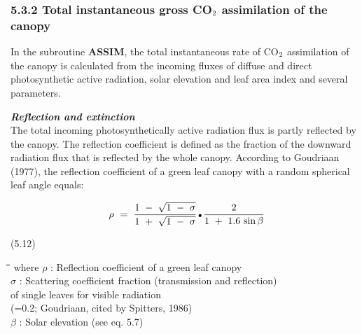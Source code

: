 \documentclass[11pt]{article}
\begin{document}
\subsubsection{  5.3.2 Total instantaneous gross CO$_{{\rm 2}}$ assimilation of the canopy  }  

In the subroutine {\bf ASSIM}, the total instantaneous rate of CO$_{{\rm 2}}$ assimilation of the canopy is
calculated from the incoming fluxes of diffuse and direct photosynthetic active radiation,
solar elevation and leaf area index and several parameters.

\bigskip
\bigskip
{\bf {\it Reflection and extinction\/}}\\
The total incoming photosynthetically active radiation flux is partly reflected by the
canopy. The reflection coefficient is defined as the fraction of the downward radiation
flux that is reflected by the whole canopy. According to Goudriaan (1977), the reflection
coefficient of a green leaf canopy with a random spherical leaf angle equals:

\begin{displaymath}
\rho ~=~{\frac{1~-~ \sqrt{1~-~ \sigma } }{1~+~ \sqrt{1~-~ \sigma } }} \, {\rm \Bullet{0.75ex}}\,{\frac{2}{1~+~ 1.6\, \sin \beta }}
\end{displaymath}

 \bigskip
\strut\hfill (5.12)

\nwln
\begin{tabbing}
\hspace{1.27cm}\=\hspace{1.27cm}\=\hspace{1.27cm}\=\hspace{1.27cm}\=%
\hspace{1.27cm}\=\hspace{1.27cm}\=\hspace{1.27cm}\=\hspace{1.27cm}\=%
\hspace{1.27cm}\=\hspace{1.27cm}\=\kill
where\> $\rho$\> : Reflection coefficient of a green leaf canopy\> \> \> \> \> \> \> \> [-]\\
\>$\sigma$\> : Scattering coefficient fraction (trans\-mission and reflection) \\
\>\>   of single leaves for visible radiation \> \> \> \> \> \> \> \> [-]\\
\>\>   {\small (=0.2; Goudriaan, cited by Spitters, 1986)}\\
\>$\beta$\> : Solar elevation (see eq. 5.7)\> \> \> \> \> \> \> \> [degrees]
\end{tabbing}
\end{document}
